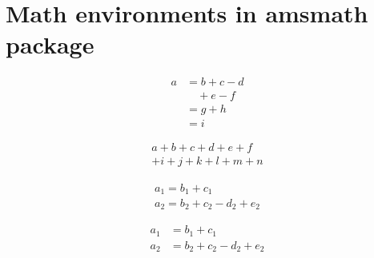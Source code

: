 \section{Math environments in amsmath package}
\begin{equation}\label{eq:one}
\begin{split}
  a & = b+c-d\\
    & \quad +e-f\\
    & =g+h\\
    & =i
\end{split}
\end{equation}

\begin{multline}
a+b+c+d+e+f\\
+i+j+k+l+m+n
\end{multline}

\begin{gather}
a_1=b_1+c_1\\
a_2=b_2+c_2-d_2+e_2
\end{gather}

\begin{align}
a_1& =b_1+c_1\\
a_2& =b_2+c_2-d_2+e_2
\end{align}
